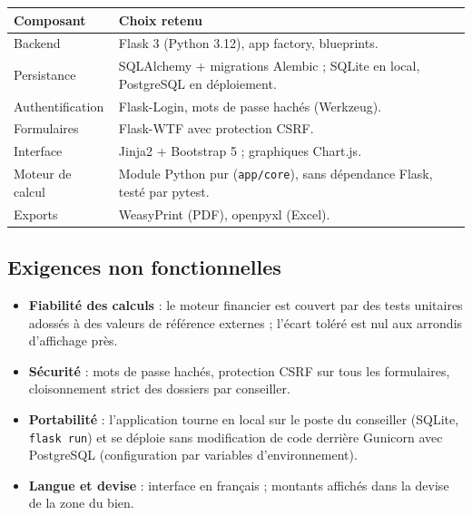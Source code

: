 \documentclass[11pt,a4paper]{article}
\begin{document}
	\begin{table}[H]
		\centering
		\small
		\renewcommand{\arraystretch}{1.40}
		\begin{tabular}{|>{\raggedright\arraybackslash}p{4.5cm}|>{\raggedright\arraybackslash}p{10.5cm}|}
			\hline
			\rowcolor{eccblue!15}
			\textbf{\color{eccblue}Composant} & \textbf{\color{eccblue}Choix retenu} \\
			\hline
			\rowcolor{white}
			Backend & Flask 3 (Python 3.12), app factory, blueprints. \\
			\rowcolor{gray!8}
			Persistance & SQLAlchemy + migrations Alembic ; SQLite en local, PostgreSQL en déploiement. \\
			\rowcolor{white}
			Authentification & Flask-Login, mots de passe hachés (Werkzeug). \\
			\rowcolor{gray!8}
			Formulaires & Flask-WTF avec protection CSRF. \\
			\rowcolor{white}
			Interface & Jinja2 + Bootstrap 5 ; graphiques Chart.js. \\
			\rowcolor{gray!8}
			Moteur de calcul & Module Python pur (\texttt{app/core}), sans dépendance Flask, testé par pytest. \\
			\rowcolor{white}
			Exports & WeasyPrint (PDF), openpyxl (Excel). \\
			\hline
		\end{tabular}
	\end{table}

	\subsection{Exigences non fonctionnelles}
	\begin{itemize}
		\item \textbf{Fiabilité des calculs} : le moteur financier est couvert par des tests unitaires adossés à des valeurs de référence externes ; l'écart toléré est nul aux arrondis d'affichage près.
		\item \textbf{Sécurité} : mots de passe hachés, protection CSRF sur tous les formulaires, cloisonnement strict des dossiers par conseiller.
		\item \textbf{Portabilité} : l'application tourne en local sur le poste du conseiller (SQLite, \texttt{flask run}) et se déploie sans modification de code derrière Gunicorn avec PostgreSQL (configuration par variables d'environnement).
		\item \textbf{Langue et devise} : interface en français ; montants affichés dans la devise de la zone du bien.
	\end{itemize}
\end{document}
